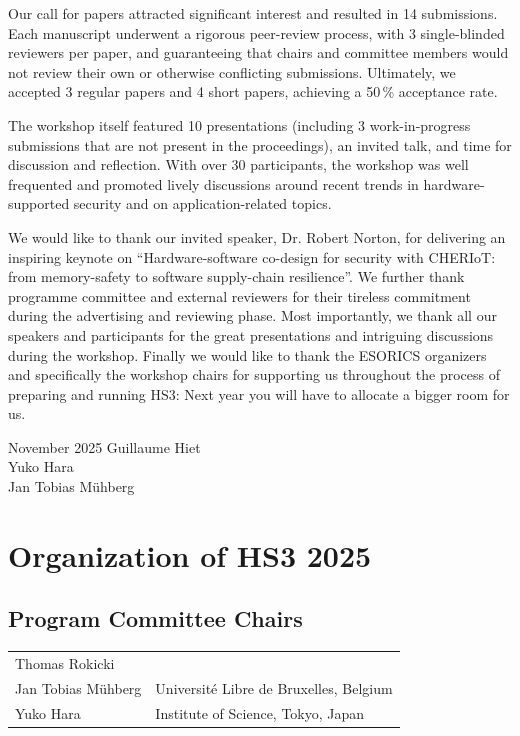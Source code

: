 \documentclass[runningheads]{llncs}
\begin{document}
Our call for papers attracted significant interest and resulted in 14
submissions. Each manuscript underwent a rigorous peer-review process, with
3 single-blinded reviewers per paper, and guaranteeing that chairs and
committee members would not review their own or otherwise conflicting
submissions. Ultimately, we accepted 3 regular papers and 4 short papers,
achieving a 50\,\% acceptance rate.

The workshop itself featured 10 presentations (including 3 work-in-progress
submissions that are not present in the proceedings), an invited talk, and
time for discussion and reflection. With over 30 participants, the workshop
was well frequented and promoted lively discussions around recent trends in
hardware-supported security and on application-related topics.

We would like to thank our invited speaker, Dr. Robert Norton, for
delivering an inspiring keynote on \enquote{Hardware-software co-design for
security with CHERIoT: from memory-safety to software supply-chain
resilience}. We further thank programme committee and external reviewers
for their tireless commitment during the advertising and reviewing phase.
Most importantly, we thank all our speakers and participants for the great
presentations and intriguing discussions during the workshop. Finally we
would like to thank the ESORICS organizers and specifically the workshop
chairs for supporting us throughout the process of preparing and running
HS3: Next year you will have to allocate a bigger room for us.

\medskip

\begin{flushright}
\noindent November 2025\hfill
{Guillaume Hiet} \\
{Yuko Hara} \\
{Jan Tobias M\"uhberg} \\
\end{flushright}


\chapter*{Organization of HS3 2025}
\setlength{\tabcolsep}{0pt}     %
\setlength{\LTpre}{0pt}         %

\section*{Program Committee Chairs}
\begin{longtable}{p{}p{}}
Thomas Rokicki       & \\
Jan Tobias M\"uhberg & Universit\'e Libre de Bruxelles, Belgium \\
Yuko Hara            & Institute of Science, Tokyo, Japan \\
\end{longtable}
\end{document}
